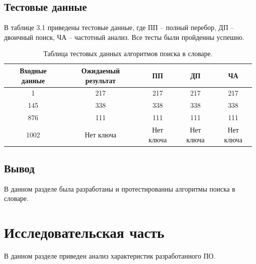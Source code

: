 \documentclass[12pt]{report}
\begin{document}
	
\section{Тестовые данные}

В таблице 3.1 приведены тестовые данные, где ПП -- полный перебор, ДП -- двоичный поиск, ЧА -- частотный анализ. Все тесты были пройденны успешно.

\begin{table}[H]
	\caption{Таблица тестовых данных алгоритмов поиска в словаре.}

	\begin{center}

		\begin{tabular}{|c c c c c|} 

			\hline

			Входные данные & Ожидаемый результат & ПП & ДП & ЧА \\  

			\hline

			1 & 217 & 217 & 217 & 217 \\

			\hline

			145 & 338 & 338 & 338 & 338 \\

			\hline

			876 & 111 & 111 & 111 & 111 \\

			\hline

			1002 & Нет ключа & Нет ключа & Нет ключа & Нет ключа \\
			\hline
		\end{tabular}

	\end{center}

\end{table}
	
\section*{Вывод}
	
В данном разделе была разработаны и протестированны алгоритмы поиска в словаре.
	
\chapter{Исследовательская часть}
	
В данном разделе приведен анализ характеристик разработанного ПО.
	
\end{document}
